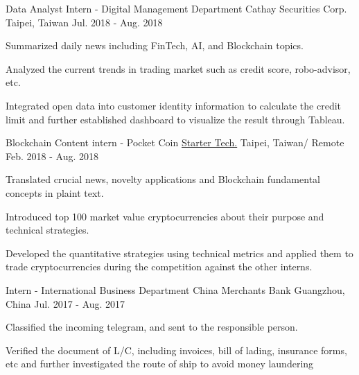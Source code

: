 

\begin{cventries}

  \cventry
    {Data Analyst Intern - Digital Management Department} %
    {Cathay Securities Corp.} %
    {Taipei, Taiwan} %
    {Jul. 2018 - Aug. 2018} %
    {
      \begin{cvitems} %
        \item {Summarized daily news including FinTech, AI, and Blockchain topics.}
        \item {Analyzed the current trends in trading market such as credit score, robo-advisor, etc.}
        \item {Integrated open data into customer identity information to calculate the credit limit and further established dashboard to visualize the result through Tableau.}
      \end{cvitems}
    }

  \cventry
    {Blockchain Content intern - Pocket Coin} %
    {\href{http://pocketcoin.tw}{Starter Tech.}} %
    {Taipei, Taiwan/ Remote} %
    {Feb. 2018 - Aug. 2018} %
    {
      \begin{cvitems} %
        \item {Translated crucial news, novelty applications and Blockchain fundamental concepts in plaint text.}
        \item {Introduced top 100 market value cryptocurrencies about their purpose and technical strategies.}
        \item {Developed the quantitative strategies using technical metrics and applied them to trade cryptocurrencies during the competition against the other interns.}
      \end{cvitems}
    }

  \cventry
    {Intern - International Business Department} %
    {China Merchants Bank} %
    {Guangzhou, China} %
    {Jul. 2017 - Aug. 2017} %
    {
      \begin{cvitems} %
        \item {Classified the incoming telegram, and sent to the responsible person.}
        \item {Verified the document of L/C, including invoices, bill of lading, insurance forms, etc and further investigated the route of ship to avoid money laundering}
      \end{cvitems}
    }

\end{cventries}

